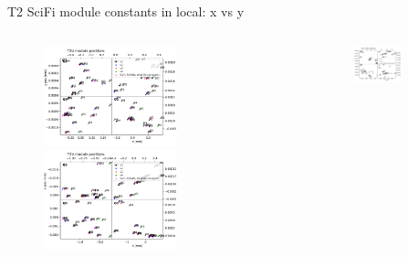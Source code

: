 \documentclass[aspectratio=1610, 12pt]{beamer}
\begin{document}
\begin{frame}{T2 SciFi module constants in local: x vs y}
  \begin{columns}
    \begin{column}[c]{0.5\textwidth}
      \begin{figure}
        \includegraphics[width=0.61\textwidth]{plots/out_x_y_pos/retest_x_vs_y_local_T2U.pdf}
        \includegraphics[width=0.61\textwidth]{plots/out_x_y_pos/retest_x_vs_y_local_T2V.pdf}
      \end{figure}
    \end{column}
    \begin{column}[c]{0.5\textwidth}
      \begin{figure}
        \includegraphics[width=0.61\textwidth]{plots/out_x_y_pos/retest_x_vs_y_local_T2X1.pdf}

\end{figure}
\end{column}
\end{columns}
\end{frame}
\end{document}
